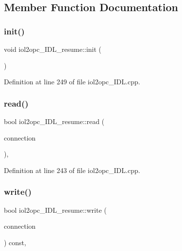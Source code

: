 \subsection{Member Function Documentation}
\mbox{\label{classiol2opc__IDL__resume_aaa0eb236ad333fe632b5d1fceb26ab97}} 
\subsubsection{\texorpdfstring{init()}{init()}}
{\footnotesize\ttfamily void iol2opc\+\_\+\+I\+D\+L\+\_\+resume\+::init (\begin{DoxyParamCaption}{ }\end{DoxyParamCaption})}



Definition at line 249 of file iol2opc\+\_\+\+I\+D\+L.\+cpp.

\mbox{\label{classiol2opc__IDL__resume_ac2c03f7c09cb3901a8f879306bfd823e}} 
\subsubsection{\texorpdfstring{read()}{read()}}
{\footnotesize\ttfamily bool iol2opc\+\_\+\+I\+D\+L\+\_\+resume\+::read (\begin{DoxyParamCaption}\item[{yarp\+::os\+::\+Connection\+Reader \&}]{connection }\end{DoxyParamCaption})\hspace{0.3cm}{\ttfamily [override]}, {\ttfamily [virtual]}}



Definition at line 243 of file iol2opc\+\_\+\+I\+D\+L.\+cpp.

\mbox{\label{classiol2opc__IDL__resume_afd2563b731bbdd6383c6d3aaf0047375}} 
\subsubsection{\texorpdfstring{write()}{write()}}
{\footnotesize\ttfamily bool iol2opc\+\_\+\+I\+D\+L\+\_\+resume\+::write (\begin{DoxyParamCaption}\item[{yarp\+::os\+::\+Connection\+Writer \&}]{connection }\end{DoxyParamCaption}) const\hspace{0.3cm}{\ttfamily [override]}, {\ttfamily [virtual]}}



